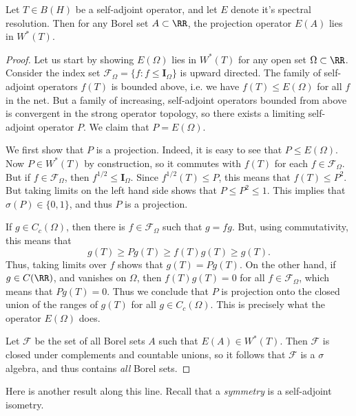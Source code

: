 \begin{theorem}
    Let $T \in B(H)$ be a self-adjoint operator, and let $E$ denote it's spectral resolution. Then for any Borel set $A \subset \RR$, the projection operator $E(A)$ lies in $W^*(T)$.
\end{theorem}
\begin{proof}
    Let us start by showing $E(\Omega)$ lies in $W^*(T)$ for any open set $\Omega \subset \RR$. Consider the index set $\mathcal{F}_\Omega = \{ f : f \leq \mathbf{I}_\Omega \}$ is upward directed. The family of self-adjoint operators $f(T)$ is bounded above, i.e. we have $f(T) \leq E(\Omega)$ for all $f$ in the net. But a family of increasing, self-adjoint operators bounded from above is convergent in the strong operator topology, so there exists a limiting self-adjoint operator $P$. We claim that $P = E(\Omega)$.

    We first show that $P$ is a projection. Indeed, it is easy to see that $P \leq E(\Omega)$. Now $P \in W^*(T)$ by construction, so it commutes with $f(T)$ for each $f \in \mathcal{F}_\Omega$. But if $f \in \mathcal{F}_\Omega$, then $f^{1/2} \leq \mathbf{I}_\Omega$. Since $f^{1/2}(T) \leq P$, this means that $f(T) \leq P^2$. But taking limits on the left hand side shows that $P \leq P^2 \leq 1$. This implies that $\sigma(P) \in \{ 0, 1 \}$, and thus $P$ is a projection.

    If $g \in C_c(\Omega)$, then there is $f \in \mathcal{F}_\Omega$ such that $g = fg$. But, using commutativity, this means that
    \[ g(T) \geq P g(T) \geq f(T) g(T) \geq g(T). \]
    Thus, taking limits over $f$ shows that $g(T) = Pg(T)$. On the other hand, if $g \in C(\RR)$, and vanishes on $\Omega$, then $f(T) g(T) = 0$ for all $f \in \mathcal{F}_\Omega$, which means that $P g(T) = 0$. Thus we conclude that $P$ is projection onto the closed union of the ranges of $g(T)$ for all $g \in C_c(\Omega)$. This is precisely what the operator $E(\Omega)$ does.

    Let $\mathcal{F}$ be the set of all Borel sets $A$ such that $E(A) \in W^*(T)$. Then $\mathcal{F}$ is closed under complements and countable unions, so it follows that $\mathcal{F}$ is a $\sigma$ algebra, and thus contains \emph{all} Borel sets.
\end{proof}

Here is another result along this line. Recall that a \emph{symmetry} is a self-adjoint isometry.

